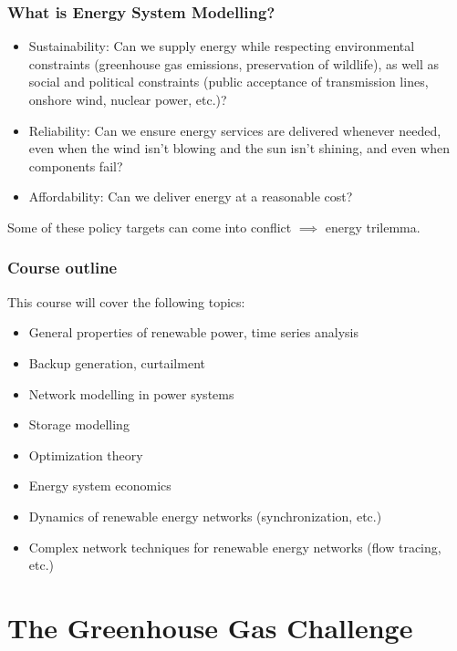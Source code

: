 \documentclass[10pt,aspectratio=169,dvipsnames]{beamer}
\let\olditem\item
\renewcommand{\item}{%
\olditem\vspace{5pt}}
\begin{document}
\begin{frame}
  \frametitle{What is Energy System Modelling?}

  \begin{itemize}
  \item \alert{Sustainability}: Can we supply energy while respecting environmental constraints (greenhouse gas emissions, preservation of wildlife), as well as social and political constraints (public acceptance of transmission lines, onshore wind, nuclear power, etc.)?
  \item \alert{Reliability}: Can we ensure energy services are delivered whenever needed, even when the wind isn't blowing and the sun isn't shining, and even when components fail?
  \item \alert{Affordability}: Can we deliver energy at a reasonable cost?
  \end{itemize}

  \vspace{1cm}

  Some of these policy targets can come into \alert{conflict} $\implies$ \alert{energy trilemma}.


\end{frame}


\begin{frame}
  \frametitle{Course outline}

  This course will cover the following topics:

  \begin{itemize}
  \item General properties of renewable power, time series analysis
    \item Backup generation, curtailment
  \item Network modelling in power systems
  \item Storage modelling
  \item Optimization theory
  \item Energy system economics
    \item Dynamics of renewable energy networks (synchronization, etc.)
      \item Complex network techniques for renewable energy networks (flow tracing, etc.)
  \end{itemize}


\end{frame}






\section{The Greenhouse Gas Challenge}
\end{document}
